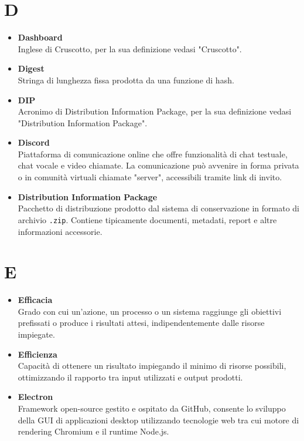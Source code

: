 \documentclass[a4paper,12pt]{article}
\begin{document}
        \section*{D} {
            \begin{itemize}
                \item \textbf{Dashboard}\\
                    Inglese di Cruscotto, per la sua definizione vedasi "Cruscotto".
                \item \textbf{Digest}\\
                    Stringa di lunghezza fissa prodotta da una funzione di hash.
                \item \textbf{DIP}\\
                    Acronimo di Distribution Information Package, per la sua definizione vedasi "Distribution Information Package".
                \item \textbf{Discord}\\
                    Piattaforma di comunicazione online che offre funzionalità di chat testuale, chat vocale e video chiamate. La comunicazione può avvenire in forma privata o in comunità virtuali chiamate "server", accessibili tramite link di invito.
                \item \textbf{Distribution Information Package}\\
                    Pacchetto di distribuzione prodotto dal sistema di conservazione in formato di archivio \verb|.zip|. Contiene tipicamente documenti, metadati, report e altre informazioni accessorie.
            \end{itemize}
        }
        \newpage

        \section*{E} {
            \begin{itemize}
                \item \textbf{Efficacia}\\
                    Grado con cui un'azione, un processo o un sistema raggiunge gli obiettivi prefissati o produce i risultati attesi, indipendentemente dalle risorse impiegate.
                \item \textbf{Efficienza}\\
                    Capacità di ottenere un risultato impiegando il minimo di risorse possibili, ottimizzando il rapporto tra input utilizzati e output prodotti.
                \item \textbf{Electron}\\
                    Framework open-source gestito e ospitato da GitHub, consente lo sviluppo della GUI di applicazioni desktop utilizzando tecnologie web tra cui motore di rendering Chromium e il runtime Node.js.
            \end{itemize}
        }
        \newpage
\end{document}

